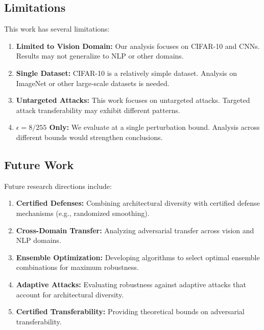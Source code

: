 \documentclass[10pt,conference]{IEEEtran}
\begin{document}
\subsection{Limitations}

This work has several limitations:

\begin{enumerate}
    \item \textbf{Limited to Vision Domain:} Our analysis focuses on CIFAR-10 and CNNs. Results may not generalize to NLP or other domains.
    
    \item \textbf{Single Dataset:} CIFAR-10 is a relatively simple dataset. Analysis on ImageNet or other large-scale datasets is needed.
    
    \item \textbf{Untargeted Attacks:} This work focuses on untargeted attacks. Targeted attack transferability may exhibit different patterns.
    
    \item \textbf{$\epsilon=8/255$ Only:} We evaluate at a single perturbation bound. Analysis across different bounds would strengthen conclusions.
\end{enumerate}

\subsection{Future Work}

Future research directions include:

\begin{enumerate}
    \item \textbf{Certified Defenses:} Combining architectural diversity with certified defense mechanisms (e.g., randomized smoothing).
    
    \item \textbf{Cross-Domain Transfer:} Analyzing adversarial transfer across vision and NLP domains.
    
    \item \textbf{Ensemble Optimization:} Developing algorithms to select optimal ensemble combinations for maximum robustness.
    
    \item \textbf{Adaptive Attacks:} Evaluating robustness against adaptive attacks that account for architectural diversity.
    
    \item \textbf{Certified Transferability:} Providing theoretical bounds on adversarial transferability.
\end{enumerate}
\end{document}
